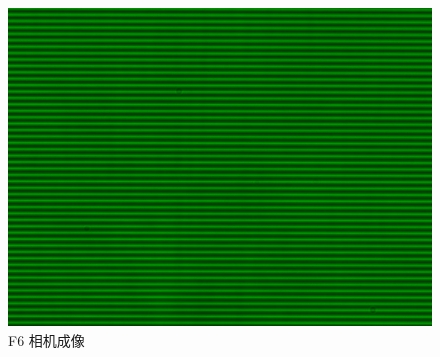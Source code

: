 \documentclass{ctexart}
\begin{document}
\begin{figure}[H]
\begin{minipage}[b]{0.3\textwidth}
    \includegraphics[width=\textwidth]{pictures/F6-mask-Ex11.png}
    \caption{F6 相机成像}
  \end{minipage}
\end{figure}
\end{document}
